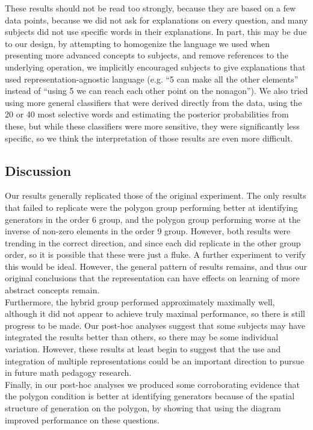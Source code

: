 \documentclass[11pt]{article}
\begin{document}
These results should not be read too strongly, because they are based on a few data points, because we did not ask for explanations on every question, and many subjects did not use specific words in their explanations. In part, this may be due to our design, by attempting to homogenize the language we used when presenting more advanced concepts to subjects, and remove references to the underlying operation, we implicitly encouraged subjects to give explanations that used representation-agnostic language (e.g. ``5 can make all the other elements'' instead of ``using 5 we can reach each other point on the nonagon''). We also tried using more general classifiers that were derived directly from the data, using the 20 or 40 most selective words and estimating the posterior probabilities from these, but while these classifiers were more sensitive, they were significantly less specific, so we think the interpretation of those results are even more difficult. 
\subsection{Discussion}
Our results generally replicated those of the original experiment. The only results that failed to replicate were the polygon group performing better at identifying generators in the order 6 group, and the polygon group performing worse at the inverse of non-zero elements in the order 9 group. However, both results were trending in the correct direction, and since each did replicate in the other group order, so it is possible that these were just a fluke. A further experiment to verify this would be ideal. However, the general pattern of results remains, and thus our original conclusions that the representation can have effects on learning of more abstract concepts remain. \\[11pt]
Furthermore, the hybrid group performed approximately maximally well, although it did not appear to achieve truly maximal performance, so there is still progress to be made. Our post-hoc analyses suggest that some subjects may have integrated the results better than others, so there may be some individual variation. However, these results at least begin to suggest that the use and integration of multiple representations could be an important direction to pursue in future math pedagogy research. \\[11pt]
Finally, in our post-hoc analyses we produced some corroborating evidence that the polygon condition is better at identifying generators because of the spatial structure of generation on the polygon, by showing that using the diagram improved performance on these questions. 
\end{document}

